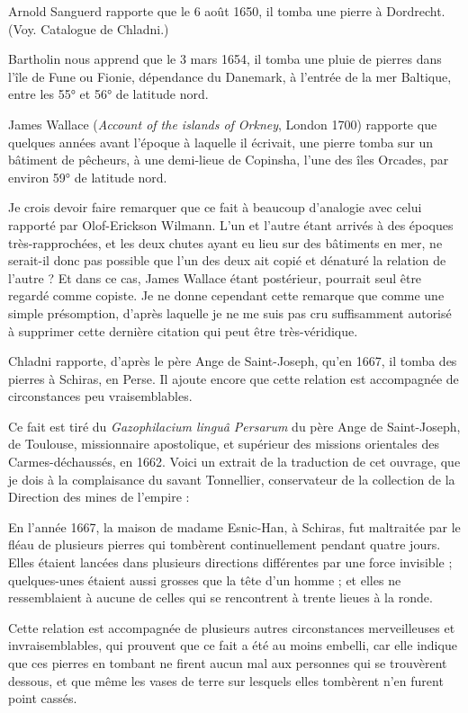 \documentclass[a4paper, 12pt, oneside, french]{article}
\begin{document}
Arnold Sanguerd rapporte que le 6 août 1650, il tomba une pierre à Dordrecht. (Voy. Catalogue de Chladni.)

Bartholin nous apprend que le 3 mars 1654, il tomba une pluie de pierres dans l'île de Fune ou Fionie, dépendance du Danemark, à l'entrée de la mer Baltique, entre les 55° et 56° de latitude nord.

James Wallace (\emph{Account of the islands of Orkney}, London 1700) rapporte que quelques années avant l'époque à laquelle il écrivait, une pierre tomba sur un bâtiment de pêcheurs, à une demi-lieue de Copinsha, l'une des îles Orcades, par environ 59° de latitude nord.

Je crois devoir faire remarquer que ce fait à beaucoup d'analogie avec celui rapporté par Olof-Erickson Wilmann. L'un et l'autre étant arrivés à des époques très-rapprochées, et les deux chutes ayant eu lieu sur des bâtiments en mer, ne serait-il donc pas possible que l'un des deux ait copié et dénaturé la relation de l'autre ? Et dans ce cas, James Wallace étant postérieur, pourrait seul être regardé comme copiste. Je ne donne cependant cette remarque que comme une simple présomption, d'après laquelle je ne me suis pas cru suffisamment autorisé à supprimer cette dernière citation qui peut être très-véridique.

Chladni rapporte, d'après le père Ange de Saint-Joseph, qu'en 1667, il tomba des pierres à Schiras, en Perse. Il ajoute encore que cette relation est accompagnée de circonstances peu vraisemblables.

Ce fait est tiré du \emph{Gazophilacium linguâ Persarum} du père Ange de Saint-Joseph, de Toulouse, missionnaire apostolique, et supérieur des missions orientales des Carmes-déchaussés, en 1662. Voici un extrait de la traduction de cet ouvrage, que je dois à la complaisance du savant Tonnellier, conservateur de la collection de la Direction des mines de l'empire :

\og En l'année 1667, la maison de madame Esnic-Han, à Schiras, fut maltraitée par le fléau de plusieurs pierres qui tombèrent continuellement pendant quatre jours. Elles étaient lancées dans plusieurs directions différentes par une force invisible ; quelques-unes étaient aussi grosses que la tête d'un homme ; et elles ne ressemblaient à aucune de celles qui se rencontrent à trente lieues à la ronde. \fg

Cette relation est accompagnée de plusieurs autres circonstances merveilleuses et invraisemblables, qui prouvent que ce fait a été au moins embelli, car elle indique que ces pierres en tombant ne firent aucun mal aux personnes qui se trouvèrent dessous, et que même les vases de terre sur lesquels elles tombèrent n'en furent point cassés.
\end{document}
